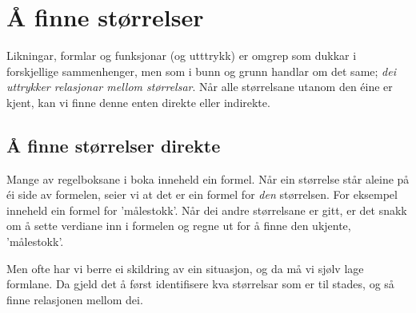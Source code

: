 



\section{Å finne størrelser}
Likningar, formlar og funksjonar (og utttrykk) er omgrep som dukkar i forskjellige sammenhenger, men som i bunn og grunn handlar om det same; \textsl{dei uttrykker relasjonar mellom størrelsar}. Når alle størrelsane utanom den éine er kjent, kan vi finne denne enten direkte eller indirekte.\vsk

\subsection{Å finne størrelser direkte}
Mange av regelboksane i boka inneheld ein formel. Når ein størrelse står aleine på éi side av formelen, seier vi at det er ein formel for \textsl{den} størrelsen. For eksempel inneheld  ein formel for 'målestokk'. Når dei andre størrelsane er gitt, er det snakk om å sette verdiane inn i formelen og regne ut for å finne den ukjente,  'målestokk'.  \vsk

Men ofte har vi berre ei skildring av ein situasjon, og da må vi sjølv lage formlane. Da gjeld det å først identifisere kva størrelsar som er til stades, og så finne relasjonen mellom dei.\regv
{}
